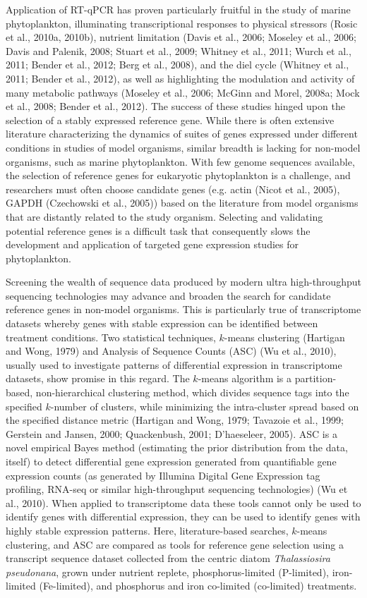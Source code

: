 	Application of RT-qPCR has proven particularly fruitful in the study of marine phytoplankton, illuminating transcriptional responses to physical stressors (Rosic et al., 2010a, 2010b), nutrient limitation (Davis et al., 2006; Moseley et al., 2006; Davis and Palenik, 2008; Stuart et al., 2009; Whitney et al., 2011; Wurch et al., 2011; Bender et al., 2012; Berg et al., 2008), and the diel cycle (Whitney et al., 2011; Bender et al., 2012), as well as highlighting the modulation and activity of many metabolic pathways (Moseley et al., 2006; McGinn and Morel, 2008a; Mock et al., 2008; Bender et al., 2012). The success of these studies hinged upon the selection of a stably expressed reference gene. While there is often extensive literature characterizing the dynamics of suites of genes expressed under different conditions in studies of model organisms, similar breadth is lacking for non-model organisms, such as marine phytoplankton. With few genome sequences available, the selection of reference genes for eukaryotic phytoplankton is a challenge, and researchers must often choose candidate genes (e.g. actin (Nicot et al., 2005), GAPDH (Czechowski et al., 2005)) based on the literature from model organisms that are distantly related to the study organism. Selecting and validating potential reference genes is a difficult task that consequently slows the development and application of targeted gene expression studies for phytoplankton. \par
	Screening the wealth of sequence data produced by modern ultra high-throughput sequencing technologies may advance and broaden the search for candidate reference genes in non-model organisms. This is particularly true of transcriptome datasets whereby genes with stable expression can be identified between treatment conditions. Two statistical techniques, $k$-means clustering (Hartigan and Wong, 1979) and Analysis of Sequence Counts (ASC) (Wu et al., 2010), usually used to investigate patterns of differential expression in transcriptome datasets, show promise in this regard. The $k$-means algorithm is a partition-based, non-hierarchical clustering method, which divides sequence tags into the specified $k$-number of clusters, while minimizing the intra-cluster spread based on the specified distance metric (Hartigan and Wong, 1979; Tavazoie et al., 1999; Gerstein and Jansen, 2000; Quackenbush, 2001; D’haeseleer, 2005). ASC is a novel empirical Bayes method (estimating the prior distribution from the data, itself) to detect differential gene expression generated from quantifiable gene expression counts (as generated by Illumina Digital Gene Expression tag profiling, RNA-seq or similar high-throughput sequencing technologies) (Wu et al., 2010). When applied to transcriptome data these tools cannot only be used to identify genes with differential expression, they can be used to identify genes with highly stable expression patterns. 
	Here, literature-based searches, $k$-means clustering, and ASC are compared as tools for reference gene selection using a transcript sequence dataset collected from the centric diatom \textit{Thalassiosira pseudonana}, grown under nutrient replete, phosphorus-limited (P-limited), iron-limited (Fe-limited), and phosphorus and iron co-limited (co-limited) treatments.

